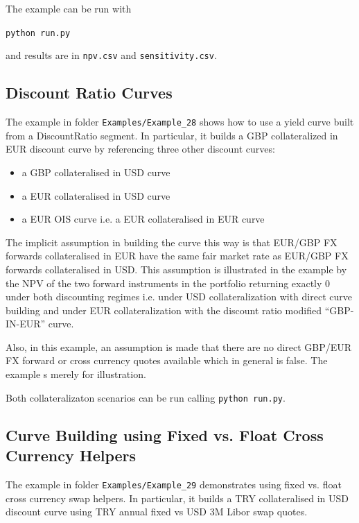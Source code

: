 \documentclass[12pt, a4paper]{article}
\begin{document}
The example can be run with

\medskip
\centerline{\tt python run.py}

\medskip
and results are in {\tt npv.csv} and {\tt sensitivity.csv}.

\subsection{Discount Ratio Curves}%
\label{example:28}

The example in folder {\tt Examples/Example\_28} shows how to use a yield curve 
built from a DiscountRatio segment. 
In particular, it builds a GBP collateralized in EUR discount curve by referencing 
three other discount curves:
\begin{itemize}
\item a GBP collateralised in USD curve
\item a EUR collateralised in USD curve
\item a EUR OIS curve i.e. a EUR collateralised in EUR curve
\end{itemize}

The implicit assumption in building the curve this way is that EUR/GBP FX 
forwards collateralised in EUR have the same fair market rate as EUR/GBP 
FX forwards collateralised in USD. This assumption is illustrated in the 
example by the NPV of the two forward instruments in the portfolio returning 
exactly 0 under both discounting regimes i.e. under USD collateralization with 
direct curve building and under EUR collateralization with the discount ratio 
modified ``GBP-IN-EUR'' curve.

Also, in this example, an assumption is made that there are no direct GBP/EUR FX 
forward or cross currency quotes available which in general is false. The example 
s merely for illustration.

Both collateralizaton scenarios can be run calling {\tt python run.py}.

\subsection{Curve Building using Fixed vs. Float Cross Currency Helpers}%
\label{example:29}

The example in folder {\tt Examples/Example\_29} demonstrates using fixed vs. float 
cross currency swap helpers. In particular, it builds a TRY collateralised in USD 
discount curve using TRY annual fixed vs USD 3M Libor swap quotes.
\end{document}
